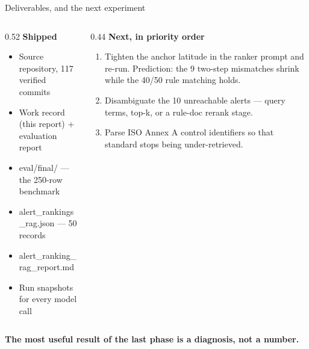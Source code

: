 \documentclass[aspectratio=169,11pt]{beamer}
\newcommand{\code}[1]{{\small\ttfamily #1}}
\newcommand{\keytake}[1]{%
  \vfill
  \noindent\colorbox{accenttint}{%
    \begin{minipage}{\dimexpr\textwidth-2\fboxsep-2\fboxrule\relax}
      \vspace{2pt}
      \small\color{accent}\textbf{#1}
      \vspace{2pt}
    \end{minipage}}\par}
\begin{document}
\begin{frame}{Deliverables, and the next experiment}
  \begin{columns}[T,onlytextwidth]
    \begin{column}{0.52\textwidth}
      \textbf{\color{accent}Shipped}
      {\small
      \begin{itemize}\setlength{\itemsep}{1pt}
        \item Source repository, 117 verified commits
        \item Work record (this report) + evaluation report
        \item \code{eval/final/} --- the 250-row benchmark
        \item \code{alert\_rankings\_rag.json} --- 50 records
        \item \code{alert\_ranking\_rag\_report.md}
        \item Run snapshots for every model call
      \end{itemize}}
    \end{column}
    \begin{column}{0.44\textwidth}
      \textbf{\color{accent}Next, in priority order}
      {\small
      \begin{enumerate}\setlength{\itemsep}{1pt}
        \item Tighten the anchor latitude in the ranker prompt and re-run. Prediction: the 9 two-step mismatches shrink while the 40/50 rule matching holds.
        \item Disambiguate the 10 unreachable alerts --- query terms, top-k, or a rule-doc rerank stage.
        \item Parse ISO Annex A control identifiers so that standard stops being under-retrieved.
      \end{enumerate}}
    \end{column}
  \end{columns}
  \vspace{0.5em}
  \keytake{The most useful result of the last phase is a diagnosis, not a number.}
\end{frame}
\end{document}
